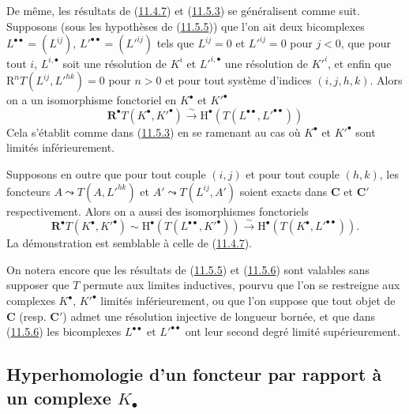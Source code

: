 \begin{env}[11.5.6]
\label{0.11.5.6-fr}
De même, les résultats de (\hyperref[0.11.4.7-fr]{11.4.7}) et
(\hyperref[0.11.5.3-fr]{11.5.3}) se généralisent comme suit. Supposons (sous
les hypothèses de (\hyperref[0.11.5.5-fr]{11.5.5})) que l'on ait deux
bicomplexes $L^{\bullet\bullet}=(L^{ij})$,
$L'^{\bullet\bullet}=(L'^{ij})$ tels que $L^{ij}=0$ et $L'^{ij}=0$ pour
$j<0$, que pour tout $i$, $L^{i,\bullet}$ soit une résolution de $K^i$ et
$L'^{i,\bullet}$ une résolution de $K'^i$, et enfin que
$\mathrm R^nT(L^{ij},L'^{hk})=0$ pour $n>0$ et pour tout système d'indices
$(i,j,h,k)$. Alors on a un isomorphisme fonctoriel en $K^\bullet$ et
$K'^\bullet$
\[
  \label{0.11.5.6.1-fr}
  \mathbf R^\bullet T(K^\bullet,K'^\bullet)\xrightarrow{\sim}
  \mathrm H^\bullet(T(L^{\bullet\bullet},L'^{\bullet\bullet}))
  \tag{11.5.6.1}
\]
Cela s'établit comme dans (\hyperref[0.11.5.3-fr]{11.5.3}) en se ramenant au
cas où $K^\bullet$ et $K'^\bullet$ sont limités inférieurement.

Supposons en outre que pour tout couple $(i,j)$ et pour tout couple $(h,k)$,
les foncteurs $A\leadsto T(A,L'^{hk})$ et $A'\leadsto T(L^{ij},A')$ soient
exacts dans $\boldsymbol{C}$ et $\boldsymbol{C}'$ respectivement. Alors on a aussi des
isomorphismes fonctoriels
\[
  \label{0.11.5.6.2-fr}
  \mathbf R^\bullet T(K^\bullet,K'^\bullet)
  \sim\mathrm H^\bullet(T(L^{\bullet\bullet},K'^\bullet))
  \xrightarrow{\sim}\mathrm H^\bullet(T(K^\bullet,L'^{\bullet\bullet})).
  \tag{11.5.6.2}
\]
La démonstration est semblable à celle de
(\hyperref[0.11.4.7-fr]{11.4.7}).
\end{env}

\begin{env}[11.5.7]
\label{0.11.5.7-fr}
On notera encore que les résultats de (\hyperref[0.11.5.5-fr]{11.5.5}) et
(\hyperref[0.11.5.6-fr]{11.5.6}) sont valables sans supposer que $T$ permute
aux limites inductives, pourvu que l'on se restreigne aux complexes
$K^\bullet$, $K'^\bullet$ limités inférieurement, ou que l'on suppose que tout
objet de $\boldsymbol{C}$ (resp. $\boldsymbol{C}'$) admet une résolution injective de
longueur bornée, et que dans (\hyperref[0.11.5.6-fr]{11.5.6}) les bicomplexes
$L^{\bullet\bullet}$ et $L'^{\bullet\bullet}$ ont leur second degré limité
supérieurement.
\end{env}

\subsection{Hyperhomologie d'un foncteur par rapport à un complexe
$K_\bullet$}
\label{subsection:0.11.6-fr}

